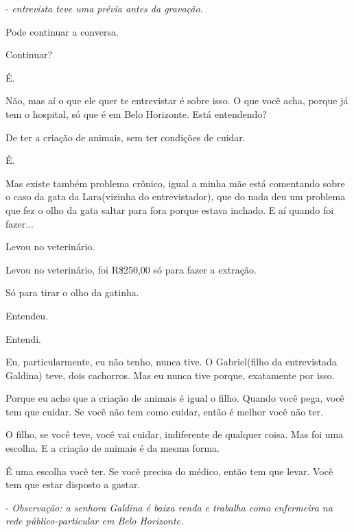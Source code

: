 \documentclass[12pt,a4paper]{article}
\newenvironment{turnos}{\begin{list}{}{\setlength{\leftmargin}{2.2cm}\setlength{\labelwidth}{2.0cm}\setlength{\labelsep}{0.2cm}\setlength{\itemsep}{0.45em}\setlength{\parsep}{0pt}}}{\end{list}}
\newcommand{\fala}[1]{\item[\textbf{#1}\hfill]}
\begin{document}
- \textit{entrevista teve uma prévia antes da gravação.}
\begin{turnos}
\fala{E:} Pode continuar a conversa. 
\fala{A:} Continuar? 
\fala{E:} É.
\fala{A:} Não, mas aí o que ele quer te entrevistar é sobre isso. O que você acha, porque já tem o hospital, só que é em Belo Horizonte. Está entendendo?
\fala{G:} De ter a criação de animais, sem ter condições de cuidar. 
\fala{A:} É.
\fala{E:} Mas existe também problema crônico, igual a minha mãe está comentando sobre o caso da gata da Lara(vizinha do entrevistador), que do nada deu um problema que fez o olho da gata saltar para fora porque estava inchado. E aí quando foi fazer...
\fala{A:} Levou no veterinário.
\fala{E:} Levou no veterinário, foi R\$250,00 só para fazer a extração.
\fala{A:} Só para tirar o olho da gatinha.
\fala{E:} Entendeu.
\fala{G:} Entendi.
\fala{G:} Eu, particularmente, eu não tenho, nunca tive. O Gabriel(filho da entrevistada Galdina) teve, dois cachorros. Mas eu nunca tive porque, exatamente por isso.
\fala{G:} Porque eu acho que a criação de animais é igual o filho. Quando você pega, você tem que cuidar. Se você não tem como cuidar, então é melhor você não ter.
\fala{G:} O filho, se você teve, você vai cuidar, indiferente de qualquer coisa. Mas foi uma escolha. E a criação de animais é da mesma forma.
\fala{G:} É uma escolha você ter. Se você precisa do médico, então tem que levar. Você tem que estar disposto a gastar.

- \textit{Observação: a senhora Galdina é baixa renda e trabalha como enfermeira na rede público-particular em Belo Horizonte.}


\end{turnos}
\end{document}
